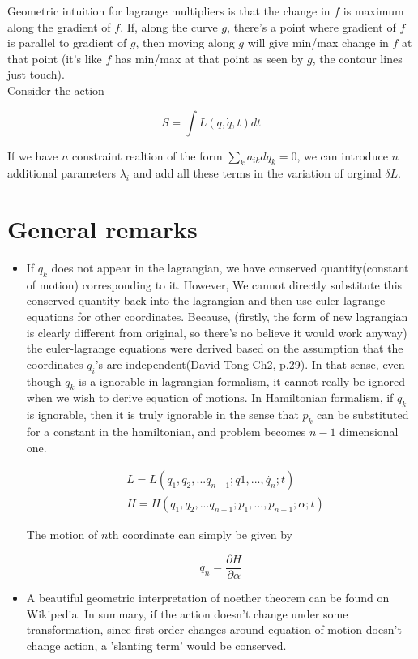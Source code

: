 \documentclass{report}
\begin{document}
\noindent Geometric intuition for lagrange multipliers is that the change in $f$ is maximum along the gradient of $f$. If, along the curve $g$, there's a point where gradient of $f$ is parallel to gradient of $g$, then moving along $g$ will give min/max change in $f$ at that point (it's like $f$ has min/max at that point as seen by $g$, the contour lines just touch).\\

\noindent Consider the action 

$$S = \int L(q,\dot{q},t) dt$$

\noindent If we have $n$ constraint realtion of the form $\sum_{k}a_{ik} dq_k = 0$, we can introduce $n$ additional parameters $\lambda_i$ and add all these terms in the variation of orginal $\delta L$.

\section{General remarks}

\begin{itemize}
  \item If $q_k$ does not appear in the lagrangian, we have conserved quantity(constant of motion) corresponding to it. However, We cannot directly substitute this conserved quantity back into the lagrangian and then use euler lagrange equations for other coordinates. Because, (firstly, the form of new lagrangian is clearly different from original, so there's no believe it would work anyway) the euler-lagrange equations were derived based on the assumption that the coordinates $q_i$'s are independent(David Tong Ch2, p.29). In that sense, even though $q_k$ is a ignorable in lagrangian formalism, it cannot really be ignored when we wish to derive equation of motions. In Hamiltonian formalism, if $q_k$ is ignorable, then it is truly ignorable in the sense that $p_k$ can be substituted for a constant in the hamiltonian, and problem becomes $n-1$ dimensional one.

\begin{align}
&L = L(q_1,q_2,...q_{n-1};\dot{q1},...,\dot{q_n};t)\\
&H = H(q_1,q_2,...q_{n-1}; p_1,...,p_{n-1};\alpha;t)
\end{align}

The motion of $n$th coordinate can simply be given by 

$$\dot{q_n} = \frac{\partial H}{\partial\alpha}$$

  \item A beautiful geometric interpretation of noether theorem can be found on Wikipedia. In summary, if the action doesn't change under some transformation, since first order changes around equation of motion doesn't change action, a 'slanting term' would be conserved.
\end{itemize}
\end{document}
